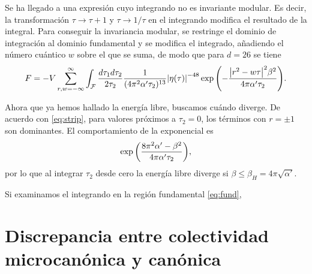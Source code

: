 
Se ha llegado a una expresión cuyo integrando no es invariante modular. Es decir, la 
transformación $\tau\to\tau+1$ y $\tau\to1/\tau$ en el integrando modifica el resultado
de la integral.
Para conseguir la invariancia modular, se restringe el dominio de integración al dominio
fundamental y se modifica el integrado, añadiendo el número cuántico $w$ sobre el que 
se suma, de modo que para $d=26$ se tiene
\begin{equation}
  F=-V \sum_{r,w=-\infty}^{\infty} \int_\mathcal{F}  \frac{d\tau_1d\tau_2}{2\tau_2}   \frac{1}{(4\pi^2\alpha'\tau_2)^{13}}
  \abs{\eta(\tau)}^{-48}\exp\qty(-\frac{\abs{r^2-w\tau}^2\beta^2}{4\pi\alpha'\tau_2}).
  \label{eq:fund}
\end{equation}

%
%

Ahora que ya hemos hallado la energía libre, buscamos cuándo diverge.
De acuerdo con \ref{eq:strip}, para valores próximos a $\tau_2=0$, los términos con $r=\pm 1$
son dominantes. El comportamiento de la exponencial es
\begin{equation}
  \exp\qty(\frac{8\pi^2 \alpha' -\beta^2}{4\pi\alpha'\tau_2}),
\end{equation}
por lo que al integrar $\tau_2$ desde cero la energía libre diverge si $\beta\leq \beta_H=4\pi\sqrt{\alpha'}$.

Si examinamos el integrando en la región fundamental \ref{eq:fund}, 

%

\section{Discrepancia entre colectividad microcanónica y canónica}

